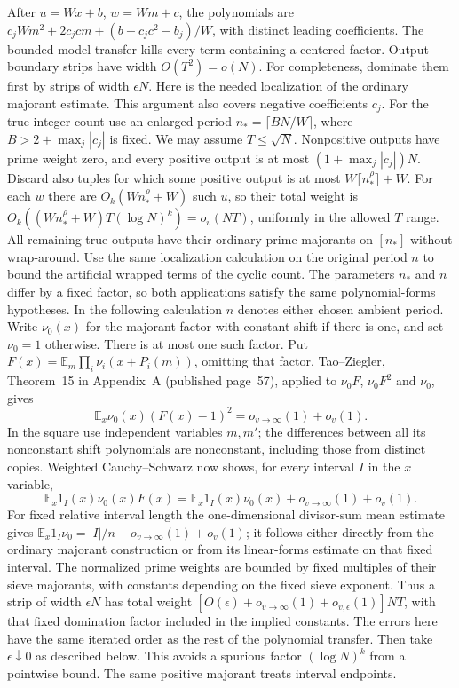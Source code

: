 After $u=Wx+b$, $w=Wm+c$, the polynomials are
$c_jWm^2+2c_jcm+(b+c_jc^2-b_j)/W$, with distinct leading coefficients.
The bounded-model transfer kills every term containing a centered
factor. Output-boundary strips have width $O(T^2)=o(N)$.
For completeness, dominate them first by strips of width $\epsilon N$.
Here is the needed localization of the ordinary majorant estimate.
This argument also covers negative coefficients $c_j$. For the true
integer count use an enlarged period $n_* = \lceil B N/W\rceil$, where
$B>2+\max_j|c_j|$ is fixed. We may assume $T\leq\sqrt N$.
Nonpositive outputs have prime weight zero, and every positive output
is at most $(1+\max_j|c_j|)N$. Discard also tuples for which some
positive output is at most $W\lceil n_*^\rho\rceil+W$. For each $w$
there are $O_k(W n_*^\rho+W)$ such $u$, so their total weight is
$O_k((W n_*^\rho+W)T(\log N)^k)=o_v(NT)$, uniformly in the
allowed $T$ range. All remaining true outputs have their ordinary
prime majorants on $[n_*]$ without wrap-around. Use the same
localization calculation on the original period $n$ to bound the
artificial wrapped terms of the cyclic count. The parameters $n_*$
and $n$ differ by a fixed factor, so both applications satisfy the
same polynomial-forms hypotheses. In the following calculation $n$
denotes either chosen ambient period.
Write $\nu_0(x)$ for the majorant factor with constant shift if there
is one, and set $\nu_0=1$ otherwise. There is at most one such factor.
Put $F(x)=\mathbb E_m\prod_i\nu_i(x+P_i(m))$, omitting that factor.
Tao--Ziegler, Theorem~15 in Appendix~A (published page~57), applied to
$\nu_0F$, $\nu_0F^2$ and $\nu_0$, gives
\[
 \mathbb E_x\nu_0(x)(F(x)-1)^2=o_{v\to\infty}(1)+o_v(1).
\]
In the square use independent variables $m,m'$; the differences
between all its nonconstant shift polynomials are nonconstant,
including those from distinct copies. Weighted Cauchy--Schwarz now
shows, for every interval $I$ in the $x$ variable,
\[
 \mathbb E_x1_I(x)\nu_0(x)F(x)
 =\mathbb E_x1_I(x)\nu_0(x)+o_{v\to\infty}(1)+o_v(1).
\]
For fixed relative interval length the one-dimensional divisor-sum
mean estimate gives
$\mathbb E_x1_I\nu_0=|I|/n+o_{v\to\infty}(1)+o_v(1)$;
it follows either directly from the ordinary majorant construction
or from its linear-forms estimate on that fixed interval.
The normalized prime weights are bounded by fixed multiples of
their sieve majorants, with constants depending on the fixed sieve
exponent. Thus a strip of width $\epsilon N$ has total weight
$[O(\epsilon)+o_{v\to\infty}(1)+o_{v,\epsilon}(1)]NT$, with that
fixed domination factor included in the implied constants.
The errors here have the same iterated order as the rest of the
polynomial transfer. Then take $\epsilon\downarrow0$ as described
below. This avoids a spurious factor $(\log N)^k$ from a pointwise
bound. The same positive majorant treats interval endpoints.

